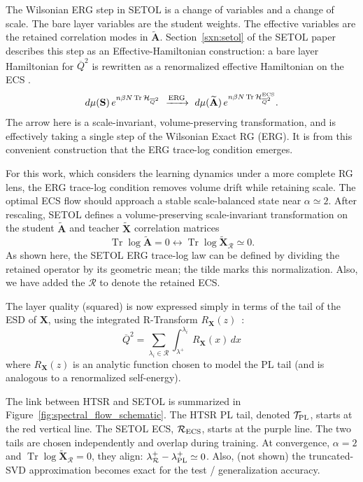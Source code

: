 \documentclass[10pt,twocolumn]{article}
\newcommand{\Tr}{\operatorname{Tr}}
\newcommand{\X}{\mathbf X}
\newcommand{\Xtilde}{\widetilde{\mathbf X}}
\newcommand{\Rell}{\mathcal R}
\newcommand{\TPL}{\mathcal T_{\rm PL}}
\newcommand{\RECS}{\mathcal R_{\rm ECS}}
\begin{document}
The Wilsonian ERG step in SETOL is a change of variables and a change of scale. The bare layer variables are the student weights. The effective variables are the retained correlation modes in $\widetilde{\mathbf A}$. Section~\ref{sxn:setol} of the SETOL paper describes this step as an Effective-Hamiltonian construction: a bare layer Hamiltonian for $\overline Q^2$ is rewritten as a renormalized effective Hamiltonian on the ECS \cite{MartinHinrichsSETOL2025}.
\[
 d\mu(\mathbf S)\,e^{n\beta N\Tr\mathcal H_{\overline Q^2}}
 \ \xrightarrow{\rm ERG}\
 d\mu(\widetilde{\mathbf A})\,
 e^{n\beta N\Tr\mathcal H_{\overline Q^2}^{\rm ECS}} .
\]
The arrow here is a scale-invariant, volume-preserving transformation, and is
effectively taking a single step of the Wilsonian Exact RG (ERG).
It is from this convenient construction that the ERG trace-log condition emerges.

For this work, which considers the learning dynamics under a more complete RG lens,
the ERG trace-log condition removes volume drift while retaining scale.
The optimal ECS flow should approach a stable scale-balanced state near $\alpha\simeq2$.
After rescaling, SETOL defines
a volume-preserving scale-invariant transformation 
on the student $\widetilde{\mathbf A}$ and teacher $\Xtilde$ correlation matrices
\begin{equation}
\Tr\log\widetilde{\mathbf A}=0 \leftrightarrow \Tr\log\Xtilde_{\Rell}\simeq0 .
\label{eq:setol_trlog_AX}
\end{equation}
As shown here, the SETOL ERG trace-log law can be defined by dividing the retained operator by its geometric mean;
the tilde marks this normalization.
Also, we have added the  $\mathcal R$ to denote the retained ECS.

The layer quality (squared) is now expressed
simply in terms of the tail of the ESD of $\X$,
using the integrated R-Transform $R_{\X}(z)$~\cite{Zee1996}:
\begin{equation}
\overline{Q}^{2}
=
\sum_{\lambda_i\in\Rell}
\int_{\lambda^{+}}^{\lambda_i}
R_{\X}(x)\, dx
\label{eq:setol_Q}
\end{equation}
where $R_{\X}(z)$ is an analytic function chosen to model the PL tail
(and is analogous to a renormalized self-energy).

The link between HTSR and SETOL is summarized in 
Figure~\ref{fig:spectral_flow_schematic}.
The HTSR PL tail, denoted $\TPL$, starts at the red vertical line.
The SETOL ECS, $\RECS$, starts at the purple line.
The two tails are chosen independently and overlap during training.
At convergence, $\alpha=2$ and $\Tr\log\Xtilde_{\Rell}=0$,
they align: $\lambda^{+}_{\Rell}-\lambda^{+}_{\rm PL}\simeq 0$.
Also, (not shown) the truncated-SVD approximation  becomes exact for the test / generalization accuracy.
\end{document}
